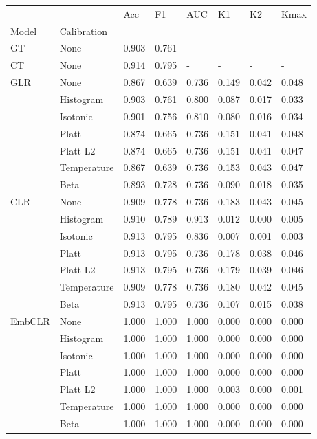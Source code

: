 \begin{tabular}{llllllll}
\toprule
 &  & Acc & F1 & AUC & K1 & K2 & Kmax \\
Model & Calibration &  &  &  &  &  &  \\
\midrule
GT & None & 0.903 & 0.761 & - & - & - & - \\
\cline{1-8}
CT & None & 0.914 & 0.795 & - & - & - & - \\
\cline{1-8}
\multirow[t]{7}{*}{GLR} & None & 0.867 & 0.639 & 0.736 & 0.149 & 0.042 & 0.048 \\
 & Histogram & 0.903 & 0.761 & 0.800 & 0.087 & 0.017 & 0.033 \\
 & Isotonic & 0.901 & 0.756 & 0.810 & 0.080 & 0.016 & 0.034 \\
 & Platt & 0.874 & 0.665 & 0.736 & 0.151 & 0.041 & 0.048 \\
 & Platt L2 & 0.874 & 0.665 & 0.736 & 0.151 & 0.041 & 0.047 \\
 & Temperature & 0.867 & 0.639 & 0.736 & 0.153 & 0.043 & 0.047 \\
 & Beta & 0.893 & 0.728 & 0.736 & 0.090 & 0.018 & 0.035 \\
\cline{1-8}
\multirow[t]{7}{*}{CLR} & None & 0.909 & 0.778 & 0.736 & 0.183 & 0.043 & 0.045 \\
 & Histogram & 0.910 & 0.789 & 0.913 & 0.012 & 0.000 & 0.005 \\
 & Isotonic & 0.913 & 0.795 & 0.836 & 0.007 & 0.001 & 0.003 \\
 & Platt & 0.913 & 0.795 & 0.736 & 0.178 & 0.038 & 0.046 \\
 & Platt L2 & 0.913 & 0.795 & 0.736 & 0.179 & 0.039 & 0.046 \\
 & Temperature & 0.909 & 0.778 & 0.736 & 0.180 & 0.042 & 0.045 \\
 & Beta & 0.913 & 0.795 & 0.736 & 0.107 & 0.015 & 0.038 \\
\cline{1-8}
\multirow[t]{7}{*}{EmbCLR} & None & 1.000 & 1.000 & 1.000 & 0.000 & 0.000 & 0.000 \\
 & Histogram & 1.000 & 1.000 & 1.000 & 0.000 & 0.000 & 0.000 \\
 & Isotonic & 1.000 & 1.000 & 1.000 & 0.000 & 0.000 & 0.000 \\
 & Platt & 1.000 & 1.000 & 1.000 & 0.000 & 0.000 & 0.000 \\
 & Platt L2 & 1.000 & 1.000 & 1.000 & 0.003 & 0.000 & 0.001 \\
 & Temperature & 1.000 & 1.000 & 1.000 & 0.000 & 0.000 & 0.000 \\
 & Beta & 1.000 & 1.000 & 1.000 & 0.000 & 0.000 & 0.000 \\
\cline{1-8}
\bottomrule
\end{tabular}
